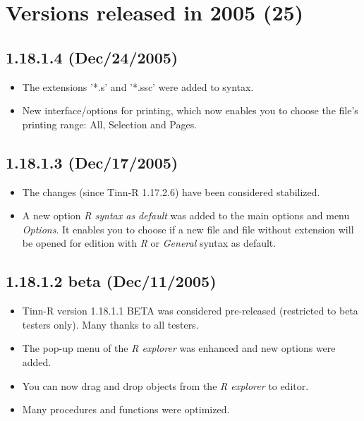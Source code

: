 
\hypertarget{2005}{}
\section{Versions released in 2005 (25)}
\subsection*{1.18.1.4 (Dec/24/2005)}
\begin{itemize}
  \item The extensions '*.s' and '*.ssc' were added to \RR{} syntax.
  \item New interface/options for printing, which now enables you to
    choose the file's printing range: All, Selection and Pages.
\end{itemize}


\subsection*{1.18.1.3 (Dec/17/2005)}
\begin{itemize}
  \item The changes (since Tinn-R 1.17.2.6) have been considered stabilized.
  \item A new option \textit{R syntax as default} was added to the main
    options and menu \textit{Options}. It enables you to choose if a new
    file and file without extension will be opened for edition with \textit{R}
    or \textit{General} syntax as default.
\end{itemize}


\subsection*{1.18.1.2 beta (Dec/11/2005)}
\begin{itemize}
  \item Tinn-R version 1.18.1.1 BETA was considered pre-released
    (restricted to beta testers only). Many thanks to all testers.
  \item The pop-up menu of the \textit{R explorer} was enhanced and
    new options were added.
  \item You can now drag and drop objects from the \textit{R explorer}
    to editor.
  \item Many procedures and functions were optimized.
\end{itemize}


